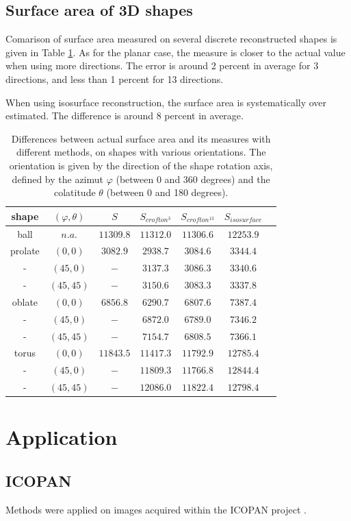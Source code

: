 \documentclass{InsightArticle}
\begin{document}

\subsection{Surface area of 3D shapes}

Comarison of surface area measured on several discrete reconstructed shapes is given in
Table \ref{tab:CompareSurfaceArea}.
As for the planar case, the measure is closer to the actual value when using more
directions. The error is around 2 percent in average for 3 directions, and less than
1 percent for 13 directions.

When using isosurface reconstruction, the surface area is systematically over estimated.
The difference is around 8 percent in average.

\begin{table}[!htb]
\begin{center}\begin{tabular}{ccccccc}
shape	& $(\varphi,\theta)$ & $S$ 	& $S_{crofton^3}$ & $S_{crofton^{13}}$ & $S_{isosurface}$ \tabularnewline \hline 
ball 		& $n.a.$  		& 	$11309.8$	& $11312.0$ 	& $11306.6$ 	& $12253.9$ 	\tabularnewline 
prolate	& $( 0,  0)$  	& 	$3082.9$ 	& $2938.7$ 	& $3084.6$ 	& $3344.4$ 	\tabularnewline
- 			& $(45,  0)$  	& 	$-$ 		& $3137.3$ 	& $3086.3$ 	& $3340.6$ 	\tabularnewline
- 			& $(45, 45)$  	& 	$-$ 		& $3150.6$ 	& $3083.3$ 	& $3337.8$ 	\tabularnewline
oblate 	& $( 0,  0)$  	& 	$6856.8$ 	& $6290.7$ 	& $6807.6$ 	& $7387.4$ 	\tabularnewline
- 			& $(45,  0)$  	& 	$-$ 		& $6872.0$ 	& $6789.0$ 	& $7346.2$ 	\tabularnewline
- 			& $(45, 45)$  	& 	$-$ 		& $7154.7$ 	& $6808.5$ 	& $7366.1$ 	\tabularnewline
torus 		& $( 0,  0)$  	& 	$11843.5$	& $11417.3$ 	& $11792.9$ 	& $12785.4$ 	\tabularnewline
-			& $(45,  0)$  	& 	$-$    	& $11809.3$ 	& $11766.8$ 	& $12844.4$ 	\tabularnewline
- 			& $(45, 45)$ 	& 	$-$ 	 	& $12086.0$ 	& $11822.4$ 	& $12798.4$ 	\tabularnewline
\end{tabular}\end{center}
\caption{ \label{tab:CompareSurfaceArea}
Differences between actual surface area and its measures with different methods, 
on shapes with various orientations.
The orientation is given by the direction of the shape rotation axis, defined by 
the azimut $\varphi$ (between 0 and 360 degrees) and the colatitude $\theta$ (between 0 and 180 degrees).}
\end{table}



\section{Application}

\subsection{ICOPAN}

Methods were applied on images acquired within the ICOPAN project \cite{Andrey2010}.

\appendix





\nocite{ITKSoftwareGuide}
\end{document}
